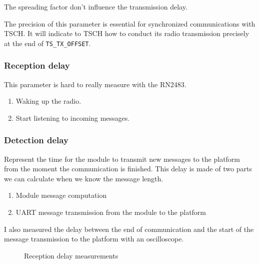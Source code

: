 The spreading factor don't influence the transmission delay.

The precision of this parameter is essential for synchronized communications
with TSCH. It will indicate to TSCH how to conduct its radio transmission
precisely at the end of \lstinline{TS_TX_OFFSET}.

\subsubsection{Reception delay}

This parameter is hard to really measure with the RN2483.

\begin{enumerate}
  \item Waking up the radio.
  \item Start listening to incoming messages.
\end{enumerate}

\subsubsection{Detection delay}


Represent the time for the module to transmit new messages to the platform
from the moment the communication is finished.
This delay is made of two parts we can calculate when we know the message
length.

\begin{enumerate}
  \item Module message computation
  \item UART message transmission from the module to the platform
\end{enumerate}

I also measured the delay between the end of communication and the start of the
message transmission to the platform with an oscilloscope.

\begin{figure}[H]
  \centering
  \caption{Reception delay measurements\label{fig:transmissiondelay}}
\end{figure}

